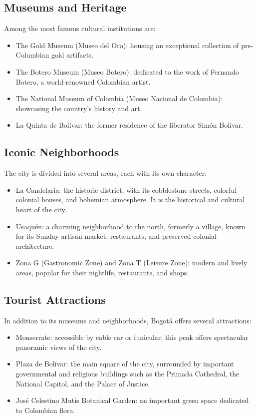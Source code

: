 \documentclass{article}
\begin{document}
\subsection{Museums and Heritage}
Among the most famous cultural institutions are:
\begin{itemize}
    \item The Gold Museum (Museo del Oro): housing an exceptional collection of pre-Columbian gold artifacts.
    \item The Botero Museum (Museo Botero): dedicated to the work of Fernando Botero, a world-renowned Colombian artist.
    \item The National Museum of Colombia (Museo Nacional de Colombia): showcasing the country's history and art.
    \item La Quinta de Bolívar: the former residence of the liberator Simón Bolívar.
\end{itemize}

\subsection{Iconic Neighborhoods}
The city is divided into several areas, each with its own character:
\begin{itemize}
    \item La Candelaria: the historic district, with its cobblestone streets, colorful colonial houses, and bohemian atmosphere. It is the historical and cultural heart of the city.    
    \item Usaquén: a charming neighborhood to the north, formerly a village, known for its Sunday artisan market, restaurants, and preserved colonial architecture.
    \item Zona G (Gastronomic Zone) and Zona T (Leisure Zone): modern and lively areas, popular for their nightlife, restaurants, and shops.
\end{itemize}

\subsection{Tourist Attractions}
In addition to its museums and neighborhoods, Bogotá offers several attractions:
\begin{itemize}
    \item Monserrate: accessible by cable car or funicular, this peak offers spectacular panoramic views of the city.
    \item Plaza de Bolívar: the main square of the city, surrounded by important governmental and religious buildings such as the Primada Cathedral, the National Capitol, and the Palace of Justice.
    \item José Celestino Mutis Botanical Garden: an important green space dedicated to Colombian flora.
\end{itemize}
\end{document}
